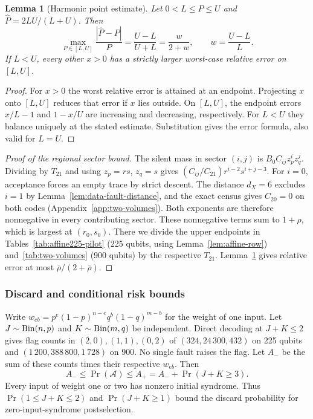 \documentclass[10pt,twocolumn]{article}
\newtheorem{lemma}[theorem]{Lemma}
\theoremstyle{definition}
\begin{document}
\begin{lemma}[Harmonic point estimate]\label{lem:harmonic-point}
Let $0<L\le P\le U$ and $\widehat P=2LU/(L+U)$. Then
\[
 \max_{P\in[L,U]}\frac{|\widehat P-P|}{P}
 =\frac{U-L}{U+L}=\frac{w}{2+w},\qquad w=\frac{U-L}{L}.
\]
If $L<U$, every other $x>0$ has a strictly larger worst-case relative
error on $[L,U]$.
\end{lemma}
\begin{proof}
For $x>0$ the worst relative error is attained at an endpoint.
Projecting $x$ onto $[L,U]$ reduces that error if $x$ lies outside.
On $[L,U]$, the endpoint errors $x/L-1$ and $1-x/U$ are increasing
and decreasing, respectively. For $L<U$ they balance uniquely at
the stated estimate. Substitution gives the error formula, also
valid for $L=U$.
\end{proof}

\begin{proof}[Proof of the regional sector bound]
The silent mass in sector $(i,j)$ is $B_0 C_{ij}z_p^i z_q^j$. Dividing by
$T_{21}$ and using $z_p=rs$, $z_q=s$ gives
$(C_{ij}/C_{21})r^{i-2}s^{i+j-3}$. For $i=0$, acceptance forces an
empty trace by strict descent. The distance $d_X=6$ excludes $i=1$
by Lemma~\ref{lem:data-fault-distance}, and the exact census gives
$C_{20}=0$ on both codes (Appendix~\ref{app:two-volumes}). Both
exponents are therefore nonnegative in every contributing sector.
These nonnegative terms sum to $1+\rho$, which is largest at $(r_0,s_0)$.
There we divide the upper endpoints in Tables~\ref{tab:affine225-pilot}
(225 qubits, using Lemma~\ref{lem:affine-row}) and~\ref{tab:two-volumes}
(900 qubits) by the respective $T_{21}$.
Lemma~\ref{lem:harmonic-point} gives relative error at most
$\bar\rho/(2+\bar\rho)$.
\end{proof}

\subsubsection{Discard and conditional risk bounds}\label{app:flag-proof}
Write $w_{eb}=p^e(1-p)^{n-e}q^b(1-q)^{m-b}$ for the weight of one
input. Let $J\sim{\rm Bin}(n,p)$ and $K\sim{\rm Bin}(m,q)$ be
independent. Direct decoding at $J+K\le2$ gives flag counts in
$(2,0),(1,1),(0,2)$ of $(324,24\,300,432)$ on 225 qubits and
$(1\,200,388\,800,1\,728)$ on 900. No single fault raises the
flag. Let $A_-$ be the sum of these counts times their respective
$w_{eb}$. Then
\[
 A_-\le\Pr(\mathcal A)\le A_+=A_-+\Pr(J+K\ge3).
\]
Every input of weight one or two has nonzero initial syndrome. Thus
$\Pr(1\le J+K\le2)$ and $\Pr(J+K\ge1)$ bound the discard probability
for zero-input-syndrome postselection.
\end{document}
